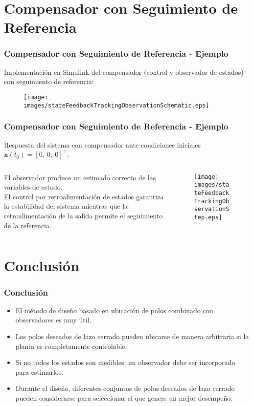 \documentclass[aspectratio=169]{beamer}
\theoremstyle{definition}
\theoremstyle{plain}
\theoremstyle{remark}
\begin{document}
\section{Compensador con Seguimiento de Referencia}
\begin{frame}[c]\frametitle{Compensador con Seguimiento de Referencia - Ejemplo}
	Implementación en Simulink del compensador (control y observador de estados) con seguimiento de referencia:
	\begin{figure}
		\centering
		\texttt{[image: images/stateFeedbackTrackingObservationSchematic.eps]}
	\end{figure}
\end{frame}

\begin{frame}[c]\frametitle{Compensador con Seguimiento de Referencia - Ejemplo}
	\small
	Respuesta del sistema con compensador ante condiciones iniciales $\mathbf{x}(t_0) = [0,\ 0,\ 0]^\intercal$.
	\vspace{-2mm}
	\begin{columns}
		\begin{column}{0.3\textwidth}
			\footnotesize El observador produce un estimado correcto de las variables de estado.\\
			\vspace{3mm}
			El control por retroalimentación de estados garantiza la estabilidad del sistema mientras que la retroalimentación de la salida permite el seguimiento de la referencia.
		\end{column}
		\begin{column}{0.7\textwidth}
			\begin{figure}
				\centering
				\texttt{[image: images/stateFeedbackTrackingObservationStep.eps]}
			\end{figure}
		\end{column}
	\end{columns}
\end{frame}

\section{Conclusión}
\begin{frame}[<+->]\frametitle{Conclusión}
	\begin{itemize}
		\item El método de diseño basado en ubicación de polos combinado con observadores es muy útil.
		\item Los polos deseados de lazo cerrado pueden ubicarse de manera arbitraria si la planta es completamente controlable.
		\item Si no todos los estados son medibles, un observador debe ser incorporado para estimarlos.
		\item Durante el diseño, diferentes conjuntos de polos deseados de lazo cerrado pueden considerarse para seleccionar el que genere un mejor desempeño.
	\end{itemize}
\end{frame}
\end{document}

